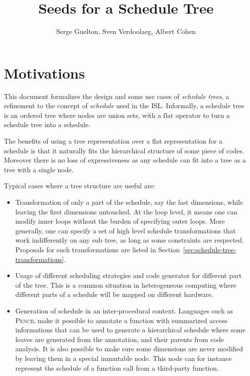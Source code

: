 \documentclass{article}
\title{Seeds for a Schedule Tree} %
\author{Serge Guelton, Sven Verdoolaeg, Albert Cohen}
\begin{document}
\maketitle

\section*{Motivations}

This document formalizes the design and some use cases of \emph{schedule
trees}, a refinement to the concept of \emph{schedule} used in the \ac{ISL}.
Informally, a schedule tree is an ordered tree where nodes are union sets, with
a $\mathrm{flat}$ operator to turn a schedule tree into a schedule.

The benefits of using a tree representation over a flat representation for a
schedule is that it naturally fits the hierarchical structure of some piece of
codes. Moreover there is no loss of expressiveness as any schedule can fit into
a tree as a tree with a single node.

Typical cases where a tree structure are useful are:

\begin{itemize}

    \item Transformation of only a part of the schedule, say the last
        dimensions, while leaving the first dimensions untouched. At the loop
        level, it means one can modify inner loops without the burden of
        specifying outer loops. More generally, one can specify a set of high
        level schedule transformations that work indifferently on any sub tree,
        as long as some constraints are respected. Proposals for such
        transformations are listed in
        Section~\ref{sec:schedule-tree-transformations}.

    \item Usage of different scheduling strategies and code generator for different
        part of the tree. This is a common situation in heterogeneous computing
        where different parts of a schedule will be mapped on different hardware.

    \item Generation of schedule in an inter-procedural context. Languages such
        as \textsc{Pencil} make it possible to annotate a function with
        summarized access informations that can be used to generate a
        hierarchical schedule where some leaves are generated from the
        annotation, and their parents from code analysis. It is also possible
        to make sure some dimensions are never modified by leaving them in a
        special immutable node. This node can for instance represent the
        schedule of a function call from a third-party function.

\end{itemize}
\end{document}
